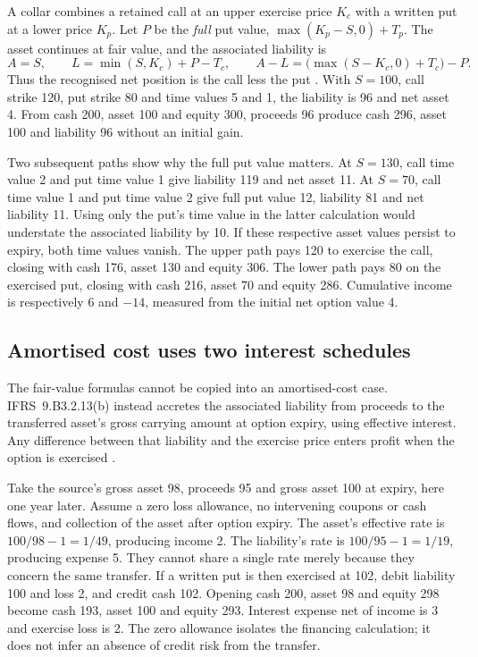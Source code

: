 A collar combines a retained call at an upper exercise price \(K_c\) with
a written put at a lower price \(K_p\). Let \(P\) be the \emph{full}
put value, \(\max(K_p-S,0)+T_p\). The asset continues at fair value, and
the associated liability is
\[
 A=S,\qquad L=\min(S,K_c)+P-T_c,\qquad
 A-L=\bigl(\max(S-K_c,0)+T_c\bigr)-P.
\]
Thus the recognised net position is the call less the put
\citep[IFRS~9.B3.2.13(e)]{eu20231803}. With \(S=100\), call strike 120,
put strike 80 and time values 5 and 1, the liability is 96 and net asset 4.
From cash 200, asset 100 and equity 300, proceeds 96 produce cash 296,
asset 100 and liability 96 without an initial gain.

Two subsequent paths show why the full put value matters. At \(S=130\),
call time value 2 and put time value 1 give liability 119 and net asset 11.
At \(S=70\), call time value 1 and put time value 2 give full put value
12, liability 81 and net liability 11. Using only the put's time value in
the latter calculation would understate the associated liability by 10.
If these respective asset values persist to expiry, both time values vanish.
The upper path pays 120 to exercise the call, closing with cash 176, asset
130 and equity 306. The lower path pays 80 on the exercised put, closing
with cash 216, asset 70 and equity 286. Cumulative income is respectively
6 and \(-14\), measured from the initial net option value 4.

\subsection{Amortised cost uses two interest schedules}

The fair-value formulas cannot be copied into an amortised-cost case.
IFRS~9.B3.2.13(b) instead accretes the associated liability from proceeds to
the transferred asset's gross carrying amount at option expiry, using
effective interest. Any difference between that liability and the exercise
price enters profit when the option is exercised
\citep[IFRS~9.B3.2.13(b)]{eu20231803}.

Take the source's gross asset 98, proceeds 95 and gross asset 100 at expiry,
here one year later. Assume a zero loss allowance, no intervening coupons
or cash flows, and collection of the asset after option expiry. The asset's
effective rate is \(100/98-1=1/49\), producing income 2. The liability's
rate is \(100/95-1=1/19\), producing expense 5. They cannot share a
single rate merely because they concern the same transfer. If a written put
is then exercised at 102, debit liability 100 and loss 2, and credit cash
102. Opening cash 200, asset 98 and equity 298 become cash 193, asset 100
and equity 293. Interest expense net of income is 3 and exercise loss is
2. The zero allowance isolates the financing calculation; it does not infer
an absence of credit risk from the transfer.
